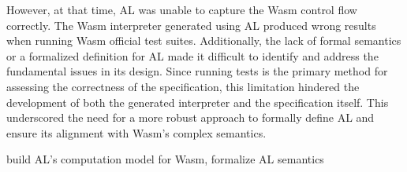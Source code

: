 However, at that time, AL was unable to capture the Wasm control flow
correctly.
The Wasm interpreter generated using AL produced wrong results when running
Wasm official test suites.
Additionally, the lack of formal semantics or a formalized definition for AL
made it difficult to identify and address the fundamental issues in its design.
Since running tests is the primary method for assessing the correctness of the
specification, this limitation hindered the development of both the generated
interpreter and the specification itself.
This underscored the need for a more robust approach to formally define AL and
ensure its alignment with Wasm's complex semantics.





build AL's computation model for Wasm, formalize AL semantics


